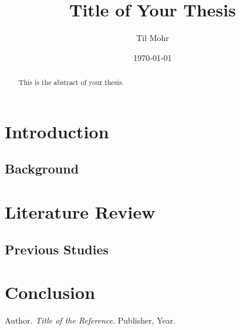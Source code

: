 \documentclass[
	12pt, %
	a4paper, %
	oneside, %
]{report}
\title{Title of Your Thesis}
\author{Til Mohr}
\date{\today}
\begin{document}
\maketitle



\begin{abstract}
This is the abstract of your thesis.
\end{abstract}

\tableofcontents

\chapter{Introduction}
\section{Background}

\chapter{Literature Review}
\section{Previous Studies}

\chapter{Conclusion}

\begin{thebibliography}{9}
 Author. \textit{Title of the Reference}. Publisher, Year.
\end{thebibliography}
\end{document}
